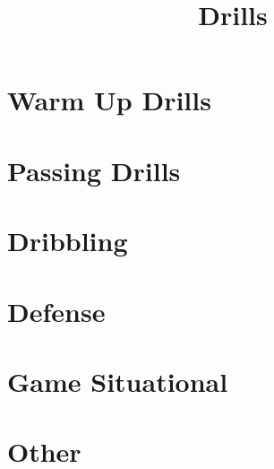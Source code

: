 \documentclass[10pt,letterpaper]{article}
\title{Drills}
\author{}
\date{}
\begin{document}
\selectfont
\maketitle

\section{Warm Up Drills}

\section{Passing Drills}
















\section{Dribbling}




\section{Defense}




\section{Game Situational}






\section{Other}

\end{document}
